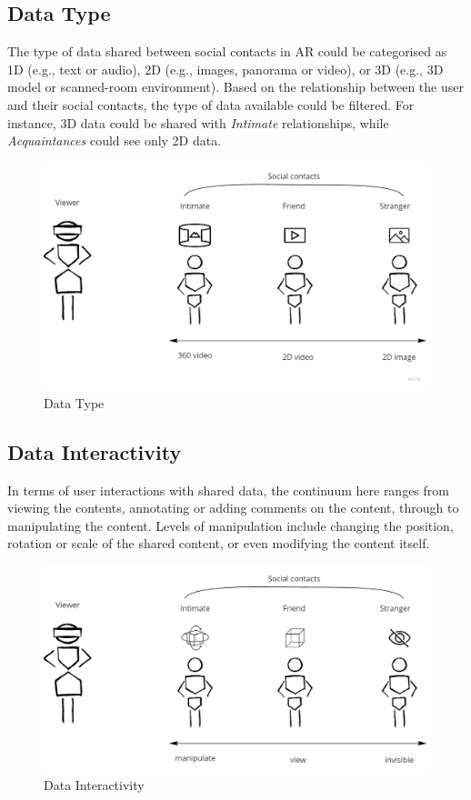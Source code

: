 \subsection{Data Type}

The type of data shared between social contacts in AR could be categorised as 1D (e.g., text or audio), 2D (e.g., images, panorama or video), or 3D (e.g., 3D model or scanned-room environment). Based on the relationship between the user and their social contacts, the type of data available could be filtered. For instance, 3D data could be shared with \textit{Intimate} relationships, while \textit{Acquaintances} could see only 2D data.  

\begin{figure}[h]
    \centering
    \includegraphics[width=.8\linewidth]{images/Continuum-Data-type.jpg}
    \caption{Data Type}
    \label{fig:continuum:data-type}
\end{figure}

\subsection{Data Interactivity}

In terms of user interactions with shared data, the continuum here ranges from viewing the contents, annotating or adding comments on the content, through to manipulating the content. Levels of manipulation include changing the position, rotation or scale of the shared content, or even modifying the content itself.

\begin{figure}[h]
    \centering
    \includegraphics[width=.8\linewidth]{images/Continuum-interaction.jpg}
    \caption{Data Interactivity}
    \label{fig:continuum:data-interaction}
\end{figure}

